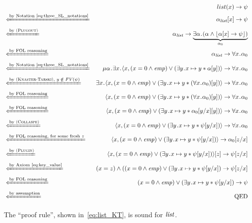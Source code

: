 \documentclass{amsart}
\begin{document}
\begin{figure}[t]
\small
\begin{align*}
&&list(x) \imp \psi \\
&\xif{by Notation~\eqref{eq:three_SL_notations}}
&\alpha_\listit[x] \imp \psi \\
&\xif{by \prule{Plugout}}
& \alpha_\listit \imp 
  \underbrace{
  \exists \alpha \ldot(\alpha \wedge \floor{\alpha[x] \imp \psi})}_{\alpha_0} \\
&\xif{by FOL reasoning}
& \alpha_\listit \imp
  \forall x \ldot \alpha_0 \\
& \xif{by Notation~\eqref{eq:three_SL_notations}}
& \mu \alpha \ldot \exists x \ldot \la x , 
  (x = 0 \wedge \emp) \vee (\exists y \ldot x \mapsto y \merge \alpha[y] )
  \ra
  \imp \forall x \ldot \alpha_0 \\
& \xif{by \prule{Knaster-Tarski}, $y \notin \FV(\psi)$}
& \exists x \ldot \la x , 
  (x = 0 \wedge \emp) \vee (\exists y \ldot x \mapsto y \merge 
  (\forall x \ldot \alpha_0)[y] )
  \ra \imp \forall x \ldot \alpha_0 \\
&\xif{by FOL reasoning}
& \la x , 
(x = 0 \wedge \emp) \vee (\exists y \ldot x \mapsto y \merge 
(\forall x \ldot \alpha_0)[y] )
\ra \imp \forall x \ldot \alpha_0 \\
&\xif{by FOL reasoning}
& \la x , 
  (x = 0 \wedge \emp) \vee (\exists y \ldot x \mapsto y \merge 
  \alpha_0[y/x][y] )
  \ra \imp \forall x \ldot \alpha_0 \\
&\xif{by \prule{Collaspe}}
& \la x , 
  (x = 0 \wedge \emp) \vee (\exists y \ldot x \mapsto y \merge 
  \psi[y/x] )
  \ra \imp \forall x \ldot \alpha_0 \\
& \xif{by FOL reasoning, for some fresh $z$}
& \la x , 
  (x = 0 \wedge \emp) \vee (\exists y \ldot x \mapsto y \merge 
  \psi[y/x] )
  \ra \imp \alpha_0[z/x] \\
& \xif{by \prule{Plugin}}
& \la x , 
  (x = 0 \wedge \emp) \vee (\exists y \ldot x \mapsto y \merge 
  \psi[y/x] )
  \ra [z] \imp \psi[z/x] \\
& \xif{by Axiom~\eqref{eq:key_value}}
&  (x = z) \wedge  
  ((x = 0 \wedge \emp) \vee (\exists y \ldot x \mapsto y \merge 
  \psi[y/x]) \imp \psi[z/x] \\
& \xif{by FOL reasoning}
& (x = 0 \wedge \emp) \vee (\exists y \ldot x \mapsto y \merge 
  \psi[y/x]) \imp \psi \\
& \xif{by assumption}
& \QED
\end{align*}
\caption{The  ``proof rule'',
shown in~\eqref{eq:list_KT}, is sound for $\mathit{list}$.}
\label{fig:proof_of_list_KT}
\end{figure}
\end{document}
